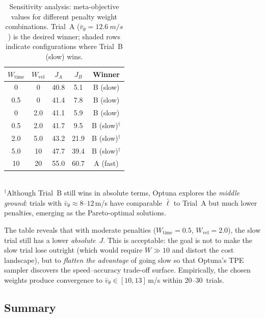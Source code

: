 \begin{table}[t]
  \centering
  \caption{Sensitivity analysis: meta-objective values for
           different penalty weight combinations.
           Trial~A ($\bar{v}_\theta = \SI{12.6}{m/s}$)
           is the desired winner;
           shaded rows indicate configurations where
           Trial~B (slow) wins.}
  \label{tab:sensitivity}
  \setlength{\tabcolsep}{4pt}
  \begin{tabular}{ccSSc}
    \toprule
    $W_{\text{time}}$ & $W_{\text{vel}}$
      & {$J_A$} & {$J_B$} & {Winner} \\
    \midrule
    0   & 0   & 40.8 &  5.1  & B (slow) \\
    0.5 & 0   & 41.4 &  7.8  & B (slow) \\
    0   & 2.0 & 41.1 &  5.9  & B (slow) \\
    0.5 & 2.0 & 41.7 &  9.5  & B (slow)$^{\dagger}$ \\
    2.0 & 5.0 & 43.2 & 21.9  & B (slow)$^{\dagger}$ \\
    5.0 & 10  & 47.7 & 39.4  & B (slow)$^{\dagger}$ \\
    10  & 20  & 55.0 & 60.7  & A (fast) \\
    \bottomrule
  \end{tabular}
  \\[4pt]
  \footnotesize
  $^{\dagger}$Although Trial~B still wins in absolute terms,
  Optuna explores the \emph{middle ground}: trials with
  $\bar{v}_\theta \approx 8$--$12$\,m/s have comparable
  $\bar\ell$ to Trial~A but much lower penalties, emerging
  as the Pareto-optimal solutions.
\end{table}

The table reveals that with moderate penalties
($W_{\text{time}} = 0.5$, $W_{\text{vel}} = 2.0$),
the slow trial still has a lower \emph{absolute}~$J$.
This is acceptable: the goal is not to make the slow trial
lose outright (which would require $W \gg 10$ and distort
the cost landscape), but to \emph{flatten the advantage}
of going slow so that Optuna's TPE sampler discovers the
speed--accuracy trade-off surface.
Empirically, the chosen weights produce convergence to
$\bar{v}_\theta \in [10, 13]$\,m/s within 20--30~trials.


\subsection{Summary}
\label{sec:obj_summary}

